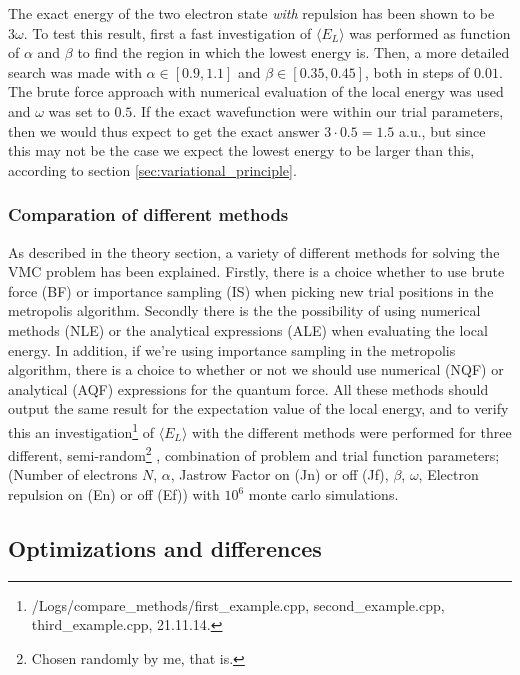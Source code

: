 The exact energy of the two electron state \textit{with} repulsion has been shown \cite{Taut} to be $3 \omega$. 
To test this result, first a fast investigation of $\langle E_L\rangle$ was performed as function of $\alpha$ and $\beta$ to find the region in which the lowest energy is. 
Then, a more detailed search was made with $\alpha \in [0.9,1.1]$ and $\beta \in [0.35,0.45]$, both in steps of $0.01$. 
The brute force approach with numerical evaluation of the local energy was used and $\omega$ was set to $0.5$.
If the exact wavefunction were within our trial parameters, then we would thus expect to get the exact answer $3 \cdot 0.5 = 1.5$ a.u., but since this may not be the case we expect the lowest energy to be larger than this, according to section \ref{sec:variational_principle}.

\subsubsection{Comparation of different methods} \label{sec:exp_methods_E}

As described in the theory section, a variety of different methods for solving the VMC problem has been explained. 
Firstly, there is a choice whether to use brute force (BF) or importance sampling (IS) when picking new trial positions in the metropolis algorithm.
Secondly there is the the possibility of using numerical methods (NLE) or the analytical expressions (ALE) when evaluating the local energy. 
In addition, if we're using importance sampling in the metropolis algorithm, there is a choice to whether or not we should 
use numerical (NQF) or analytical (AQF) expressions for the quantum force. 
All these methods should output the same result for the expectation value of the local energy, and to verify this an investigation\footnote{/Logs/compare\_methods/first\_example.cpp, second\_example.cpp, third\_example.cpp, 21.11.14.}
 of $\langle E_L \rangle$ with the different methods were performed for three different, semi-random\footnote{Chosen randomly by me, that is.}
, combination of problem and trial function parameters; (Number of electrons $N$, $\alpha$, Jastrow Factor on (Jn) or off (Jf), $\beta$, $\omega$, Electron repulsion on (En) or off (Ef)) with $10^6$ monte carlo simulations.

\subsection{Optimizations and differences}

